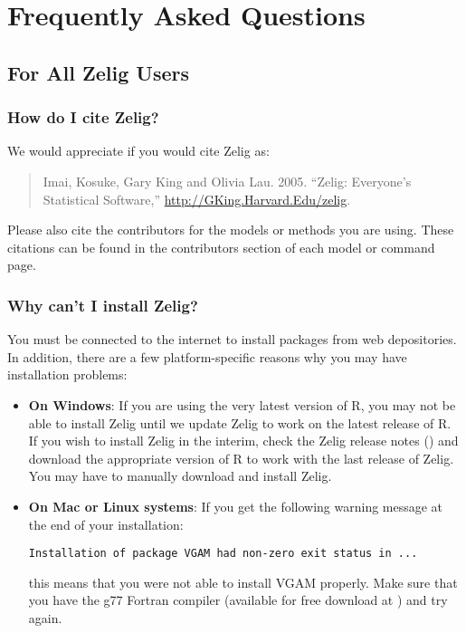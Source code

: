 \chapter{Frequently Asked Questions}

\section{For All Zelig Users}

\subsection*{How do I cite Zelig?}
We would appreciate if you would cite Zelig as:  
\begin{verse}
  Imai, Kosuke, Gary King and Olivia Lau.  2005.  ``Zelig:
  Everyone's Statistical Software,''   \url{http://GKing.Harvard.Edu/zelig}.
\end{verse}
Please also cite the contributors for the models or methods you are
using.  These citations can be found in the contributors section of
each model or command page.

\subsection*{Why can't I install Zelig?}

You must be connected to the internet to install packages from web
depositories.  In addition, there are a few platform-specific reasons
why you may have installation problems:

\begin{itemize}
\item \textbf{On Windows}: If you are using the very latest version of
  R, you may not be able to install Zelig until we update Zelig to
  work on the latest release of R. If you wish to install Zelig in the
  interim, check the Zelig release notes () and
  download the appropriate version of R to work with the last release
  of Zelig.  You may have to manually download and install Zelig.  

\item \textbf{On Mac or Linux systems}:  If you get the following
  warning message at the end of your installation:  
\begin{verbatim}
Installation of package VGAM had non-zero exit status in ...
\end{verbatim}
this means that you were not able to install VGAM properly.  Make sure
that you have the g77 Fortran compiler (available for free download at
) and
try again.  
\end{itemize}


